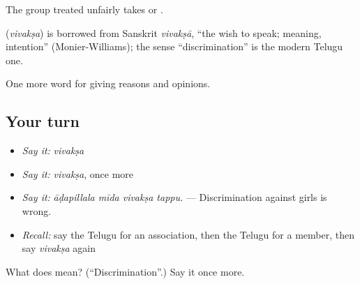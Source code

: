 The group treated unfairly takes  or .

\begin{cousinweb}
\textbf{} (\emph{vivakṣa}) is borrowed from Sanskrit \emph{vivakṣā}, \textquotedblleft{}the wish to speak; meaning, intention\textquotedblright{} (Monier-Williams); the sense \textquotedblleft{}discrimination\textquotedblright{} is the modern Telugu one.
\end{cousinweb}

\begin{grammarlens}[title={What you've built}]
One more word for giving reasons and opinions.
\end{grammarlens}

\subsection*{Your turn}
\begin{itemize}
\raggedright
  \item \emph{Say it:} \emph{vivakṣa}
  \item \emph{Say it:} \emph{vivakṣa}, once more
  \item \emph{Say it:} \emph{āḍapillala mīda vivakṣa tappu.} — Discrimination against girls is wrong.
  \item \emph{Recall:} say the Telugu for an association, then the Telugu for a member, then say \emph{vivakṣa} again
\end{itemize}

\begin{tcolorbox}[breakable,colback=teal!4,colframe=teal!35!black,title={Before you move on}]
What does  mean? (\textquotedblleft{}Discrimination\textquotedblright{}.) Say it once more.
\end{tcolorbox}
